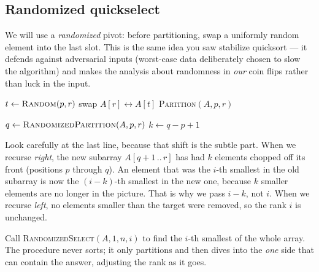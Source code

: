 \subsection{Randomized quickselect}

We will use a \emph{randomized} pivot: before partitioning, swap a uniformly random
element into the last slot. This is the same idea you saw stabilize quicksort ---
it defends against adversarial inputs (worst-case data deliberately chosen to slow the algorithm) and makes the analysis about randomness in
\emph{our} coin flips rather than luck in the input.

\begin{algorithm}[H]
\caption{\textsc{RandomizedPartition}$(A, p, r)$}\label{ch09:alg-rpartition}
$t \gets \textsc{Random}(p, r)$ 
swap $A[r] \leftrightarrow A[t]$\;
\Return \textsc{Partition}$(A, p, r)$\;
\end{algorithm}

\begin{algorithm}[H]
\caption{\textsc{RandomizedSelect}$(A, p, r, i)$}\label{ch09:alg-rselect}
$q \gets \textsc{RandomizedPartition}(A, p, r)$\;
$k \gets q - p + 1$ 
\end{algorithm}

Look carefully at the last line, because that shift is the subtle part. When we recurse
\emph{right}, the new subarray $A[q+1\,..\,r]$ has had $k$ elements chopped off its
front (positions $p$ through $q$). An element that was the $i$-th smallest in the
old subarray is now the $(i-k)$-th smallest in the new one, because $k$ smaller
elements are no longer in the picture. That is why we pass $i - k$, not $i$. When
we recurse \emph{left}, no elements smaller than the target were removed, so the
rank $i$ is unchanged.

\begin{focusbox}
Call \textsc{RandomizedSelect}$(A, 1, n, i)$ to find the $i$-th smallest of the
whole array. The procedure never sorts; it only partitions and then dives into the
\emph{one} side that can contain the answer, adjusting the rank as it goes.
\end{focusbox}


